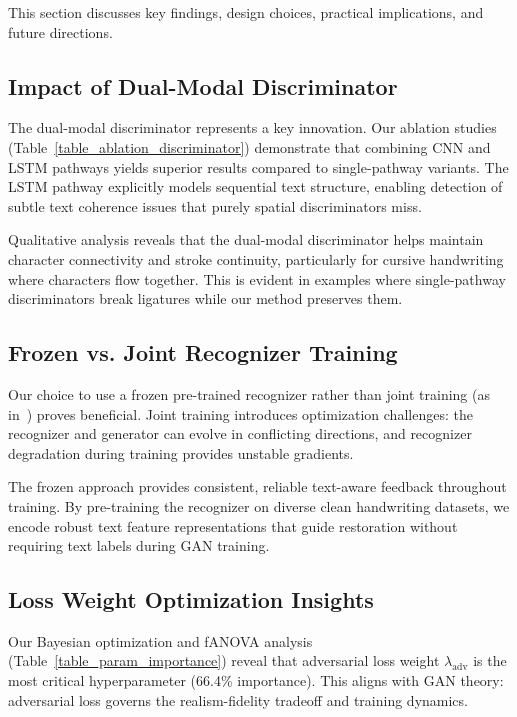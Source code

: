 \documentclass[journal]{IEEEtran}
\begin{document}
This section discusses key findings, design choices, practical implications, and future directions.

\subsection{Impact of Dual-Modal Discriminator}

The dual-modal discriminator represents a key innovation. Our ablation studies (Table~\ref{table_ablation_discriminator}) demonstrate that combining CNN and LSTM pathways yields superior results compared to single-pathway variants. The LSTM pathway explicitly models sequential text structure, enabling detection of subtle text coherence issues that purely spatial discriminators miss.

Qualitative analysis reveals that the dual-modal discriminator helps maintain character connectivity and stroke continuity, particularly for cursive handwriting where characters flow together. This is evident in examples where single-pathway discriminators break ligatures while our method preserves them.

\subsection{Frozen vs. Joint Recognizer Training}

Our choice to use a frozen pre-trained recognizer rather than joint training (as in~\cite{souibgui2021enhance}) proves beneficial. Joint training introduces optimization challenges: the recognizer and generator can evolve in conflicting directions, and recognizer degradation during training provides unstable gradients.

The frozen approach provides consistent, reliable text-aware feedback throughout training. By pre-training the recognizer on diverse clean handwriting datasets, we encode robust text feature representations that guide restoration without requiring text labels during GAN training.

\subsection{Loss Weight Optimization Insights}

Our Bayesian optimization and fANOVA analysis (Table~\ref{table_param_importance}) reveal that adversarial loss weight $\lambda_{\text{adv}}$ is the most critical hyperparameter (66.4\% importance). This aligns with GAN theory: adversarial loss governs the realism-fidelity tradeoff and training dynamics.
\end{document}
